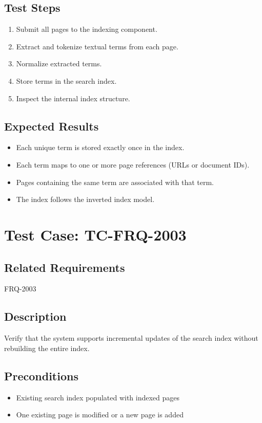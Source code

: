 \documentclass{article}
\begin{document}
\subsection*{Test Steps}
\begin{enumerate}
  \item Submit all pages to the indexing component.
  \item Extract and tokenize textual terms from each page.
  \item Normalize extracted terms.
  \item Store terms in the search index.
  \item Inspect the internal index structure.
\end{enumerate}

\subsection*{Expected Results}
\begin{itemize}
  \item Each unique term is stored exactly once in the index.
  \item Each term maps to one or more page references (URLs or document IDs).
  \item Pages containing the same term are associated with that term.
  \item The index follows the inverted index model.
\end{itemize}

\section{Test Case: TC-FRQ-2003}

\subsection*{Related Requirements}
FRQ-2003

\subsection*{Description}
Verify that the system supports incremental updates of the search index
without rebuilding the entire index.

\subsection*{Preconditions}
\begin{itemize}
  \item Existing search index populated with indexed pages
  \item One existing page is modified or a new page is added
\end{itemize}
\end{document}
